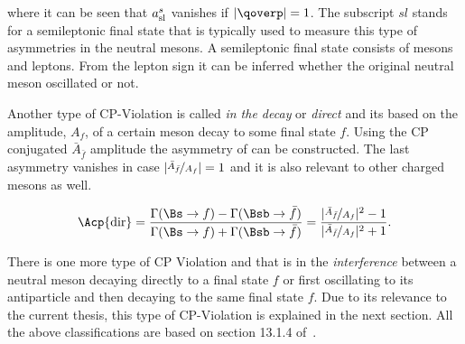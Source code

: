 \noindent where it can be seen that $a_{\rm sl}^{s}$ vanishes if $|\qoverp|= 1$. The subscript $sl$ stands for a semileptonic
final state that is typically used to measure this type of asymmetries in the neutral mesons. A semileptonic final state
consists of mesons and leptons. From the lepton sign it can be inferred whether the original neutral meson oscillated or not.

Another type of CP-Violation is called {\it in the decay} or {\it direct} and its based on the amplitude, $A_f$, of a certain meson decay to some final state $f$.
Using the CP conjugated $\bar{A}_{\bar{f}}$ amplitude the asymmetry of  can be constructed.
The last asymmetry vanishes in case $|\nicefrac{\bar{A}_{\bar{f}}}{A_f}| = 1$  and it is also relevant to other charged mesons as well.

\begin{equation}
\Acp{\text{dir}} = \frac{\Gamma(\Bs \rightarrow f) - \Gamma(\Bsb \rightarrow \bar{f})} {\Gamma(\Bs \rightarrow f) + \Gamma(\Bsb \rightarrow \bar{f})}
                 = \frac{ |\nicefrac{\bar{A}_{\bar{f}}}{A_f}|^2 - 1}{|\nicefrac{\bar{A}_{\bar{f}}}{A_f}|^2 + 1}.
\label{cpv_decay}
\end{equation}


There is one more type of CP Violation and that is in the {\it interference} between
a neutral meson decaying directly to a final state $f$ or first oscillating to its antiparticle and then decaying
to the same final state $f$. Due to its relevance to the current thesis, this type of CP-Violation is explained
in the next section. All the above classifications are based on section 13.1.4 of~\cite{PDG}.

